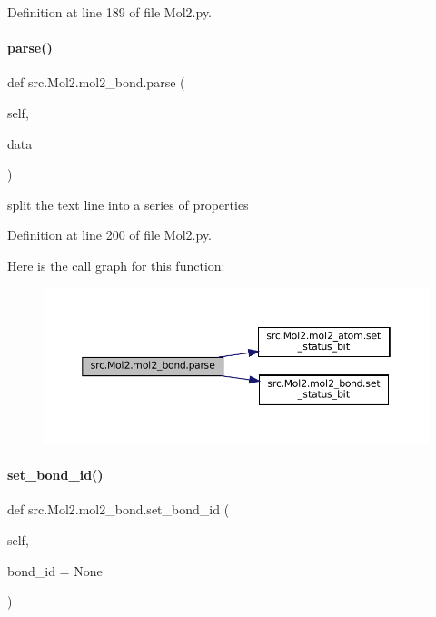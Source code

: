 Definition at line 189 of file Mol2.\+py.

\mbox{\label{classsrc_1_1Mol2_1_1mol2__bond_aed0e7a537ae4bf0b4be69a1b03c297e0}} 
\paragraph{\texorpdfstring{parse()}{parse()}}
{\footnotesize\ttfamily def src.\+Mol2.\+mol2\+\_\+bond.\+parse (\begin{DoxyParamCaption}\item[{}]{self,  }\item[{}]{data }\end{DoxyParamCaption})}



split the text line into a series of properties 



Definition at line 200 of file Mol2.\+py.

Here is the call graph for this function\+:
\nopagebreak
\begin{figure}[H]
\begin{center}
\leavevmode
\includegraphics[width=350pt]{classsrc_1_1Mol2_1_1mol2__bond_aed0e7a537ae4bf0b4be69a1b03c297e0_cgraph}
\end{center}
\end{figure}
\mbox{\label{classsrc_1_1Mol2_1_1mol2__bond_af07dc3dfa15804f72e45933c3f0d6a83}} 
\paragraph{\texorpdfstring{set\+\_\+bond\+\_\+id()}{set\_bond\_id()}}
{\footnotesize\ttfamily def src.\+Mol2.\+mol2\+\_\+bond.\+set\+\_\+bond\+\_\+id (\begin{DoxyParamCaption}\item[{}]{self,  }\item[{}]{bond\+\_\+id = {\ttfamily None} }\end{DoxyParamCaption})}



